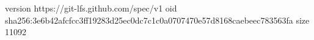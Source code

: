 version https://git-lfs.github.com/spec/v1
oid sha256:3e6b42afcfcc3ff19283d25ec0dc7c1c0a0707470e57d8168caebeec783563fa
size 11092
